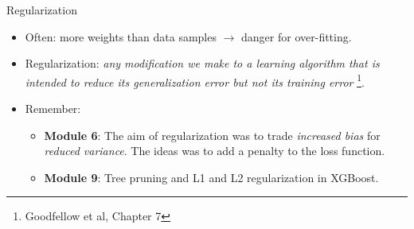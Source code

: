 \documentclass[
  10pt,
  ignorenonframetext,
  twocolumn]{beamer}
\providecommand{\tightlist}{%
  \setlength{\itemsep}{0pt}\setlength{\parskip}{0pt}}
\begin{document}
\begin{frame}
\begin{block}{Regularization}
\label{regularization}
\(~\)

\begin{itemize}
\tightlist
\item
  Often: more weights than data samples \(\rightarrow\) danger for
  over-fitting.
\end{itemize}

\vspace{2mm}

\begin{itemize}
\tightlist
\item
  Regularization: \emph{any modification we make to a learning algorithm
  that is intended to reduce its generalization error but not its
  training error} \footnote{Goodfellow et al, Chapter 7}.
\end{itemize}

\vspace{2mm}

\begin{itemize}
\item
  Remember:\vspace{2mm}

  \begin{itemize}
  \tightlist
  \item
    \textbf{Module 6}: The aim of regularization was to trade
    \emph{increased bias} for \emph{reduced variance}. The ideas was to
    add a penalty to the loss function. \vspace{1mm}
  \item
    \textbf{Module 9}: Tree pruning and L1 and L2 regularization in
    XGBoost.
  \end{itemize}
\end{itemize}

\vspace{2mm}
\end{block}
\end{frame}
\end{document}
